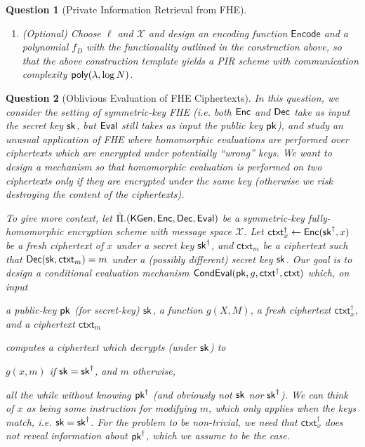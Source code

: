 \documentclass[10pt,twoside]{article}
\newif\ifsolution
\newcommand{\inputsol}[1]{\ifsolution\begin{tcolorbox}[breakable]\end{tcolorbox}\fi}
\theoremstyle{sltheorem}
\newtheorem{question}{Question}
\newcommand{\ctxt}{\mathsf{ctxt}}
\newcommand{\cX}{\mathcal{X}}
\renewcommand{\vec}[1]{\mathbf{#1}}
\begin{document}
\begin{question}[Private Information Retrieval from FHE]
\begin{enumerate}[label=(\alph*)]
\begin{enumerate}[label=(\roman*)]
            Define $\mathsf{Encode}(i) = \vec{s}_i$.
            Define the degree-$k$ polynomial $f_D(X_1,\ldots, X_\ell) = \sum_{i \in [N]} d_i \cdot \prod_{j: s_{i,j} = 1 } X_j$.
            [Hint: Use Stirling approximation.]
        \end{enumerate}
        \item (Optional) Choose $\ell$ and $\cX$ and design an encoding function $\mathsf{Encode}$ and a polynomial $f_D$ with the functionality outlined in the construction above, so that the above construction template yields a PIR scheme with communication complexity $\poly[\secpar, \log N]$.
    \end{enumerate}
\end{question}

\inputsol{PIR}


\begin{question}[Oblivious Evaluation of FHE Ciphertexts] 
    In this question, we consider the setting of symmetric-key FHE (i.e. both $\mathsf{Enc}$ and $\mathsf{Dec}$ take as input the secret key $\sk$, but $\mathsf{Eval}$ still takes as input the public key $\pk$), and study an unusual application of FHE where homomorphic evaluations are performed over ciphertexts which are encrypted under potentially ``wrong'' keys.   
    We want to design a mechanism so that homomorphic evaluation is performed on two ciphertexts only if they are encrypted under the same key (otherwise we risk destroying the content of the ciphertexts).

    To give more context, let $\tilde\Pi.(\mathsf{KGen},\mathsf{Enc},\mathsf{Dec},\mathsf{Eval})$ be a symmetric-key fully-homomorphic encryption scheme with message space $\cX$.
    Let $\ctxt^\dagger_x \gets \enc(\sk^\dagger, x)$ be a \emph{fresh} ciphertext of $x$ under a secret key $\sk^\dagger$, and
    $\ctxt_m$ be a ciphertext such that $\dec(\sk, \ctxt_m) = m$ under a (possibly different) secret key $\sk$.
    Our goal is to design a conditional evaluation mechanism $\mathsf{CondEval}(\pk, g, \ctxt^\dagger, \ctxt)$ which, on input
    \begin{center}
        a public-key $\pk$ (for secret-key) $\sk$, a function $g(X,M)$, a fresh ciphertext $\ctxt^\dagger_x$, and a ciphertext $\ctxt_m$
    \end{center}
	computes a ciphertext which decrypts (under $\sk$) to 
    \begin{center}
        $g(x,m)$ if $\sk = \sk^\dagger$, and $m$ otherwise,
    \end{center}
    all the while without knowing $\pk^\dagger$ (and obviously not $\sk$ nor $\sk^\dagger$). 
    We can think of $x$ as being some instruction for modifying $m$, which only applies when the keys match, i.e. $\sk = \sk^\dagger$.
    For the problem to be non-trivial, we need that $\ctxt^\dagger_x$ does not reveal information about $\pk^\dagger$, which we assume to be the case.


\end{question}
\end{document}

